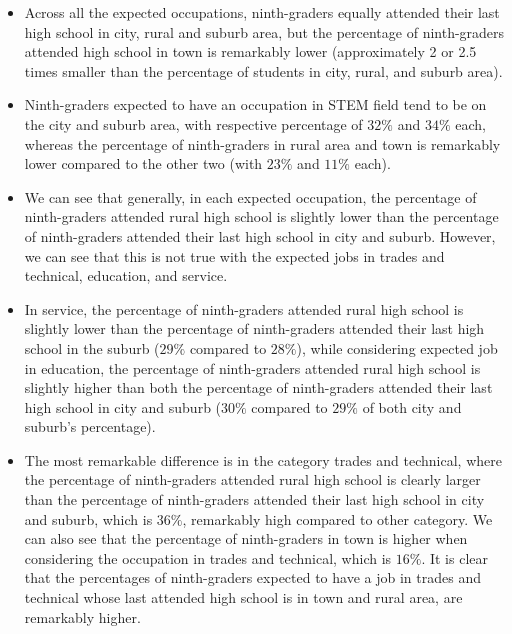 \documentclass[11pt,]{article}
\providecommand{\tightlist}{%
\setlength{\itemsep}{0pt}\setlength{\parskip}{0pt}}
\begin{document}
\begin{itemize}
\tightlist
\item
  Across all the expected occupations, ninth-graders equally attended
  their last high school in city, rural and suburb area, but the
  percentage of ninth-graders attended high school in town is remarkably
  lower (approximately 2 or 2.5 times smaller than the percentage of
  students in city, rural, and suburb area).
\item
  Ninth-graders expected to have an occupation in STEM field tend to be
  on the city and suburb area, with respective percentage of \(32 \%\)
  and \(34 \%\) each, whereas the percentage of ninth-graders in rural
  area and town is remarkably lower compared to the other two (with
  \(23 \%\) and \(11 \%\) each).
\item
  We can see that generally, in each expected occupation, the percentage
  of ninth-graders attended rural high school is slightly lower than the
  percentage of ninth-graders attended their last high school in city
  and suburb. However, we can see that this is not true with the
  expected jobs in trades and technical, education, and service.
\item
  In service, the percentage of ninth-graders attended rural high school
  is slightly lower than the percentage of ninth-graders attended their
  last high school in the suburb (\(29 \%\) compared to \(28 \%\)),
  while considering expected job in education, the percentage of
  ninth-graders attended rural high school is slightly higher than both
  the percentage of ninth-graders attended their last high school in
  city and suburb (\(30 \%\) compared to \(29 \%\) of both city and
  suburb's percentage).
\item
  The most remarkable difference is in the category trades and
  technical, where the percentage of ninth-graders attended rural high
  school is clearly larger than the percentage of ninth-graders attended
  their last high school in city and suburb, which is \(36 \%\),
  remarkably high compared to other category. We can also see that the
  percentage of ninth-graders in town is higher when considering the
  occupation in trades and technical, which is \(16 \%\). It is clear
  that the percentages of ninth-graders expected to have a job in trades
  and technical whose last attended high school is in town and rural
  area, are remarkably higher.
\end{itemize}
\newpage
\singlespacing 

\end{document}
